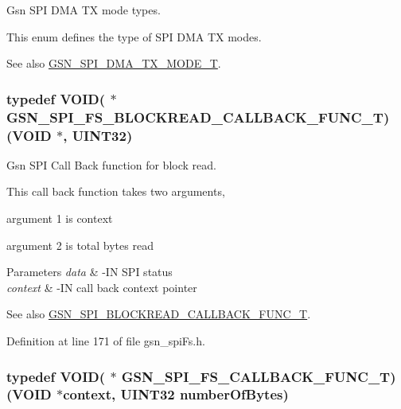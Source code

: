 Gsn SPI DMA TX mode types. 

This enum defines the type of SPI DMA TX modes. \begin{DoxySeeAlso}{See also}
\hyperlink{a00655_ga39efef290b5dfeaaa7892823d6bfd724}{GSN\_\-SPI\_\-DMA\_\-TX\_\-MODE\_\-T}. 
\end{DoxySeeAlso}
\hypertarget{a00655_ga53ed03a9d5eb404abf8ea4afb4b2ac02}{
\subsubsection[{GSN\_\-SPI\_\-FS\_\-BLOCKREAD\_\-CALLBACK\_\-FUNC\_\-T}]{\setlength{\rightskip}{0pt plus 5cm}typedef VOID( $\ast$ {\bf GSN\_\-SPI\_\-FS\_\-BLOCKREAD\_\-CALLBACK\_\-FUNC\_\-T})(VOID $\ast$, {\bf UINT32})}}
\label{a00655_ga53ed03a9d5eb404abf8ea4afb4b2ac02}


Gsn SPI Call Back function for block read. 

This call back function takes two arguments,
\begin{DoxyItemize}
\item argument 1 is context
\item argument 2 is total bytes read
\end{DoxyItemize}


\begin{DoxyParams}{Parameters}
{\em data} & -\/IN SPI status \\
\hline
{\em context} & -\/IN call back context pointer \\
\hline
\end{DoxyParams}
\begin{DoxySeeAlso}{See also}
\hyperlink{a00655_ga40c92f454b32d5fffa9780896cecdd02}{GSN\_\-SPI\_\-BLOCKREAD\_\-CALLBACK\_\-FUNC\_\-T}. 
\end{DoxySeeAlso}


Definition at line 171 of file gsn\_\-spiFs.h.

\hypertarget{a00655_gaa58c26aaa273da2e8ff41d1833d1147e}{
\subsubsection[{GSN\_\-SPI\_\-FS\_\-CALLBACK\_\-FUNC\_\-T}]{\setlength{\rightskip}{0pt plus 5cm}typedef VOID( $\ast$ {\bf GSN\_\-SPI\_\-FS\_\-CALLBACK\_\-FUNC\_\-T})(VOID $\ast$context, {\bf UINT32} numberOfBytes)}}
\label{a00655_gaa58c26aaa273da2e8ff41d1833d1147e}


